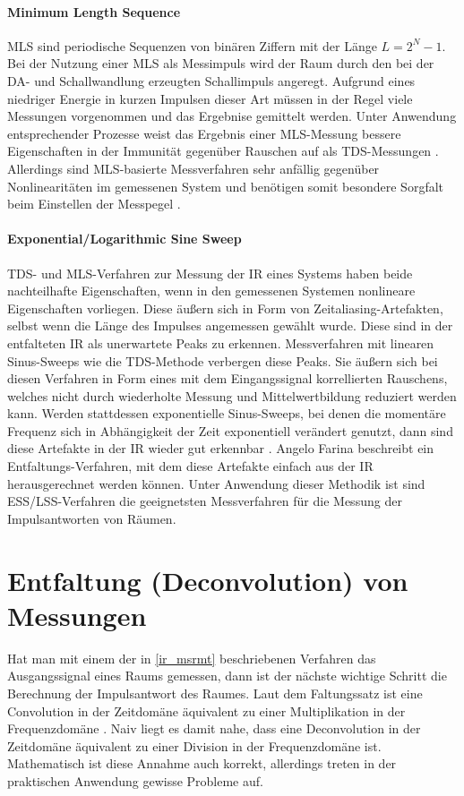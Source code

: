 \paragraph{Minimum Length Sequence}
MLS sind periodische Sequenzen von binären Ziffern mit der Länge $L=2^N-1$. Bei der Nutzung einer MLS als Messimpuls wird der Raum durch den bei
der DA- und Schallwandlung erzeugten Schallimpuls angeregt. Aufgrund eines niedriger Energie in kurzen Impulsen dieser Art müssen in der Regel viele Messungen
vorgenommen und das Ergebnise gemittelt werden. Unter Anwendung entsprechender Prozesse weist das Ergebnis einer MLS-Messung bessere Eigenschaften
in der Immunität gegenüber Rauschen auf als TDS-Messungen \cite{rife1989}. Allerdings sind MLS-basierte Messverfahren sehr anfällig gegenüber 
Nonlinearitäten im gemessenen System und benötigen somit besondere Sorgfalt beim Einstellen der Messpegel \cite{holters2009}.
\paragraph{Exponential/Logarithmic Sine Sweep}
TDS- und MLS-Verfahren zur Messung der IR eines Systems haben beide nachteilhafte Eigenschaften, wenn in den gemessenen Systemen nonlineare Eigenschaften vorliegen.
Diese äußern sich in Form von Zeitaliasing-Artefakten, selbst wenn die Länge des Impulses angemessen gewählt wurde. Diese sind in der entfalteten
IR als unerwartete Peaks zu erkennen. Messverfahren mit linearen Sinus-Sweeps wie die TDS-Methode verbergen diese Peaks. Sie äußern sich bei diesen Verfahren in Form
eines mit dem Eingangssignal korrellierten Rauschens, welches nicht durch wiederholte Messung und Mittelwertbildung reduziert werden kann. Werden stattdessen
exponentielle Sinus-Sweeps, bei denen die momentäre Frequenz sich in Abhängigkeit der Zeit exponentiell verändert genutzt, dann sind diese Artefakte in der IR wieder gut
erkennbar \cite{farina2000}. Angelo Farina beschreibt ein Entfaltungs-Verfahren, mit dem diese Artefakte einfach aus der IR herausgerechnet werden können.
Unter Anwendung dieser Methodik ist sind ESS/LSS-Verfahren die geeignetsten Messverfahren für die Messung der Impulsantworten von Räumen.

\section{Entfaltung (Deconvolution) von Messungen} \label{deconvolution}
Hat man mit einem der in \ref{ir_msrmt} beschriebenen Verfahren das Ausgangssignal eines Raums gemessen, dann ist der nächste wichtige Schritt die Berechnung der
Impulsantwort des Raumes. Laut dem Faltungssatz ist eine Convolution in der Zeitdomäne äquivalent zu einer Multiplikation in der Frequenzdomäne \cite{oppenheim1999}.
Naiv liegt es damit nahe, dass eine Deconvolution in der Zeitdomäne äquivalent zu einer Division in der Frequenzdomäne ist. Mathematisch ist diese Annahme auch korrekt,
allerdings treten in der praktischen Anwendung gewisse Probleme auf. 

